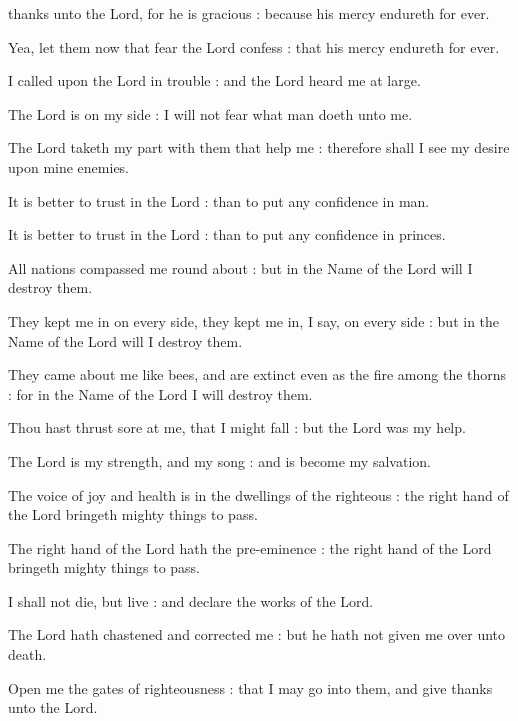 
 thanks unto the Lord, for he is gracious : because his mercy endureth for ever.\par
{}
Yea, let them now that fear the Lord confess : that his mercy endureth for ever.\par
{}I called upon the Lord in trouble : and the Lord heard me at large.\par
{}The Lord is on my side : I will not fear what man doeth unto me.\par
{}The Lord taketh my part with them that help me : therefore shall I see my desire upon mine enemies.\par
{}It is better to trust in the Lord : than to put any confidence in man.\par
{}It is better to trust in the Lord : than to put any confidence in princes.\par
{}All nations compassed me round about : but in the Name of the Lord will I destroy them.\par
{}They kept me in on every side, they kept me in, I say, on every side : but in the Name of the Lord will I destroy them.\par
{}They came about me like bees, and are extinct even as the fire among the thorns : for in the Name of the Lord I will destroy them.\par
{}Thou hast thrust sore at me, that I might fall : but the Lord was my help.\par
{}The Lord is my strength, and my song : and is become my salvation.\par
{}The voice of joy and health is in the dwellings of the righteous : the right hand of the Lord bringeth mighty things to pass.\par
{}The right hand of the Lord hath the pre-eminence : the right hand of the Lord bringeth mighty things to pass.\par
{}I shall not die, but live : and declare the works of the Lord.\par
{}The Lord hath chastened and corrected me : but he hath not given me over unto death.\par
{}Open me the gates of righteousness : that I may go into them, and give thanks unto the Lord.\par
